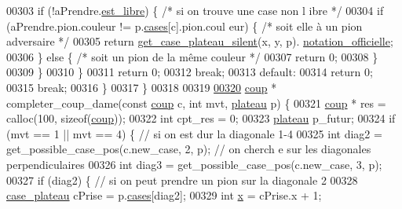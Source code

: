 \begin{DoxyCode}
00303                         \textcolor{keywordflow}{if} (!aPrendre.\hyperlink{structcase__plateau_a173f25d2fd7c653d77ca8174ba4f636d}{est_libre}) \{ \textcolor{comment}{/* si on trouve une case non l
      ibre */}
00304                                 \textcolor{keywordflow}{if} (aPrendre.pion.couleur != p.\hyperlink{structplateau_a6afaa60f594542e0d742b0c6d3223392}{cases}[c].pion.coul
      eur) \{ \textcolor{comment}{/* soit elle à un pion adversaire */}
00305                                         \textcolor{keywordflow}{return} \hyperlink{plateau_8h_a60a8f706865d0ae9087f8d65d4667655}{get_case_plateau_silent}(x, y, p).
      \hyperlink{structcase__plateau_ad510581b324604a9cf685cbb769a421a}{notation_officielle};
00306                                 \} \textcolor{keywordflow}{else} \{ \textcolor{comment}{/* soit un pion de la même couleur */}
00307                                         \textcolor{keywordflow}{return} 0;
00308                                 \}
00309                         \}
00310                 \}
00311                 \textcolor{keywordflow}{return} 0;
00312                 \textcolor{keywordflow}{break};
00313         \textcolor{keywordflow}{default}:
00314                 \textcolor{keywordflow}{return} 0;
00315                 \textcolor{keywordflow}{break};
00316         \}
00317 \}
00318 
00319 
\hypertarget{regles_8c_source_l00320}{}\hyperlink{regles_8h_a1bff1ac214ab2332d8b7e3a0b79f262c}{00320} \hyperlink{structcoup}{coup} * completer\_coup\_dame(\textcolor{keyword}{const} \hyperlink{structcoup}{coup} c, \textcolor{keywordtype}{int} mvt, \hyperlink{structplateau}{plateau} p) \{
00321         \hyperlink{structcoup}{coup} * res = calloc(100, \textcolor{keyword}{sizeof}(\hyperlink{structcoup}{coup}));
00322         \textcolor{keywordtype}{int} cpt\_res = 0;
00323         \hyperlink{structplateau}{plateau} p\_futur;
00324         \textcolor{keywordflow}{if} (mvt == 1 || mvt == 4) \{ \textcolor{comment}{// si on est dur la diagonale 1-4}
00325                 \textcolor{keywordtype}{int} diag2 = get\_possible\_case\_pos(c.new\_case, 2, p); \textcolor{comment}{// on cherch
      e sur les diagonales perpendiculaires}
00326                 \textcolor{keywordtype}{int} diag3 = get\_possible\_case\_pos(c.new\_case, 3, p);
00327                 \textcolor{keywordflow}{if} (diag2) \{ \textcolor{comment}{// si on peut prendre un pion sur la diagonale 2}
00328                         \hyperlink{structcase__plateau}{case_plateau} cPrise = p.\hyperlink{structplateau_a6afaa60f594542e0d742b0c6d3223392}{cases}[diag2];
00329                         \textcolor{keywordtype}{int} \hyperlink{plateau_8h_a9e00f85b4b6ec2d8bdfbe94ff40f0eeeacab1e15e82c5976bfb476ddfe145263c}{x} = cPrise.x + 1;

\end{DoxyCode}
